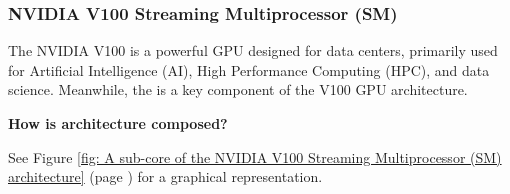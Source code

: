 \subsubsection{NVIDIA V100 Streaming Multiprocessor (SM)}\label{subsubsection: NVIDIA V100 Streaming Multiprocessor (SM)}

The NVIDIA V100 is a powerful GPU designed for data centers, primarily used for Artificial Intelligence (AI), High Performance Computing (HPC), and data science. Meanwhile, the  is a key component of the V100 GPU architecture.

\highspace
\begin{flushleft}
    \textcolor{Green3}{ \textbf{How is architecture composed?}}
\end{flushleft}
See Figure \ref{fig: A sub-core of the NVIDIA V100 Streaming Multiprocessor (SM) architecture} (page \pageref{fig: A sub-core of the NVIDIA V100 Streaming Multiprocessor (SM) architecture}) for a graphical representation.
